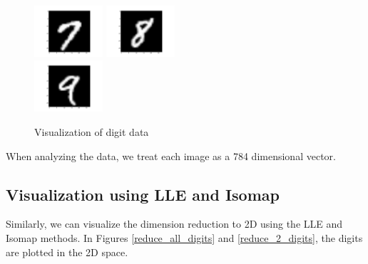 \documentclass[11pt]{article}
\begin{document}
\begin{figure}[H]
\begin{center}
\includegraphics[width=1in]{7.png}
\includegraphics[width=1in]{8.png}\\
\includegraphics[width=1in]{9.png}
\caption{Visualization of digit data}
\label{digit-vis}
\end{center}
\end{figure}
When analyzing the data, we treat each image as a 784 dimensional vector.


\subsection*{Visualization using LLE and Isomap}
Similarly, we can visualize the dimension reduction to 2D using the LLE and Isomap methods. In Figures \ref{reduce_all_digits} and \ref{reduce_2_digits}, the digits are plotted in the 2D space.
\end{document}
